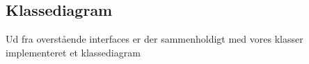 
\subsection{Klassediagram}
Ud fra overstående interfaces er der sammenholdigt med vores klasser implementeret et klassediagram


